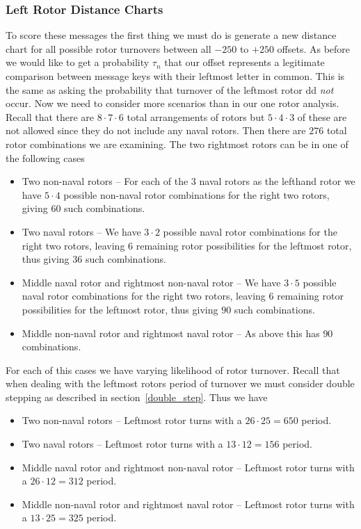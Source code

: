   \subsubsection{Left Rotor Distance Charts}
  To score these messages the first thing we must do is generate a
  new distance chart for all possible rotor turnovers between all
  $-250$ to $+250$ offsets. As before we would like to get a
  probability $\tau_n$ that our offset represents a legitimate
  comparison between message keys with their leftmost letter in
  common. This is the same as asking the probability that turnover of
  the leftmost rotor dd \emph{not} occur. Now we need to consider
  more scenarios than in our one rotor analysis. Recall that there
  are $8\cdot7\cdot6$ total arrangements of rotors but
  $5\cdot4\cdot3$ of these are not allowed since they do not include
  any naval rotors. Then there are $276$ total rotor combinations we
  are examining. The two rightmost rotors can be in one of the following cases
  \begin{itemize}
    \item Two non-naval rotors -- For each of the $3$ naval rotors as
      the lefthand rotor we have $5\cdot4$ possible non-naval rotor
      combinations for the right two rotors, giving $60$ such combinations.
    \item Two naval rotors --  We have $3\cdot2$ possible naval rotor
      combinations for the right two rotors, leaving $6$ remaining
      rotor possibilities for the leftmost rotor, thus giving $36$
      such combinations.
    \item Middle naval rotor and rightmost non-naval rotor --  We
      have $3\cdot5$ possible naval rotor combinations for the right
      two rotors, leaving $6$ remaining rotor possibilities for the
      leftmost rotor, thus giving $90$ such combinations.
    \item Middle non-naval rotor and rightmost naval rotor --  As
      above this has $90$ combinations.
  \end{itemize}

  For each of this cases we have varying likelihood of rotor
  turnover. Recall that when dealing with the leftmost rotors period
  of turnover we must consider double stepping as described in
  section~\ref{double_step}. Thus we have

  \begin{itemize}
    \item Two non-naval rotors -- Leftmost rotor turns with a
      $26\cdot25 = 650$ period.
    \item Two naval rotors --  Leftmost rotor turns with a $13\cdot12
      = 156$ period.
    \item Middle naval rotor and rightmost non-naval rotor --
      Leftmost rotor turns with a $26\cdot12 = 312$ period.
    \item Middle non-naval rotor and rightmost naval rotor --
      Leftmost rotor turns with a $13\cdot25 = 325$ period.
  \end{itemize}

